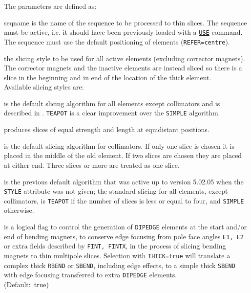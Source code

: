 The parameters are defined as: 
\begin{madlist}
    seqname is the name of the sequence to be
   processed to thin slices. The sequence must be active, i.e. it should
   have been previously loaded with a \hyperref[sec:use]{\texttt{USE}} command.  
   The sequence must use the default positioning of elements
   ({\texttt{REFER=centre}}). 

    the slicing style to be used for all active elements (excluding corrector magnets).
   The corrector magnets and the inactive elements are instead sliced so there is a slice in the 
   beginning and in end of the location of the thick element.  \\
   Available slicing styles are: 

   \begin{madlist}
   	 is the default slicing algorithm for all elements 
   	except collimators and is described in \cite{burkhardt2013}. 
   	\texttt{TEAPOT} is a clear improvement over the \texttt{SIMPLE} algorithm.
   	
   	 produces slices of equal strength and length at equidistant
   	positions.
   	
   	 is the default slicing algorithm for collimators. 
   	If only one slice is chosen it is placed in the middle of the old
   	element. If two slices are chosen they are placed at either
   	end. Three slices or more are treated as one slice. 
   	
   	 is the previous default algorithm 
   	that was active up to version 5.02.05 when the \texttt{STYLE} 
   	attribute was not given; the standard slicing for all
   	elements, except collimators, is \texttt{TEAPOT} if the number
   	of slices is less or equal to four, and \texttt{SIMPLE} otherwise.
   
   \end{madlist}
   
    is a logical flag to control the generation of
   \texttt{DIPEDGE} elements at the start and/or end of bending magnets,
   to conserve edge focusing from pole face angles \texttt{E1, E2}
   or extra fields described by \texttt{FINT, FINTX}, in the
   process of slicing bending magnets to thin multipole slices.   
   Selection with \texttt{THICK=true} will translate a complex thick 
   \texttt{RBEND} or \texttt{SBEND}, including edge effects, to a simple
   thick \texttt{SBEND} with edge focusing transferred to extra 
   \texttt{DIPEDGE} elements. \\ 
   (Default:~true)
\end{madlist}

